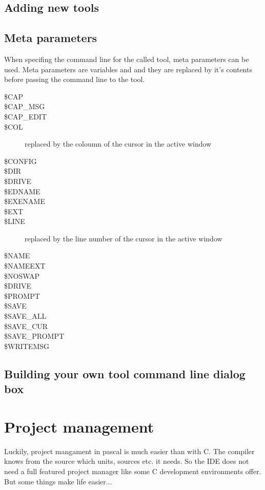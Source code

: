 \subsection{Adding new tools}
\label{se:addingtools}

\subsection{Meta parameters}
When specifing the command line for the called tool, meta parameters can
be used. Meta parameters are variables and and they are replaced
by it's contents before passing the command line to the tool.

\begin{description}
\item[\$CAP]
\item[\$CAP\_MSG]
\item[\$CAP\_EDIT]
\item[\$COL] replaced by the coloumn of the cursor in the active window
\item[\$CONFIG]
\item[\$DIR]
\item[\$DRIVE]
\item[\$EDNAME]
\item[\$EXENAME]
\item[\$EXT]
\item[\$LINE] replaced by the line number of the cursor in the active window
\item[\$NAME]
\item[\$NAMEEXT]
\item[\$NOSWAP]
\item[\$DRIVE]
\item[\$PROMPT]
\item[\$SAVE]
\item[\$SAVE\_ALL]
\item[\$SAVE\_CUR]
\item[\$SAVE\_PROMPT]
\item[\$WRITEMSG]
\end{description}

\subsection{Building your own tool command line dialog box}

\section{Project management}
\label{se:projectmanagement}
Luckily, project mangament in pascal is much easier than with C. The
compiler knows from the source which units, sources etc. it needs.
So the \fpc IDE does not need a full featured project manager like
some C development environments offer. But some things make life easier...

